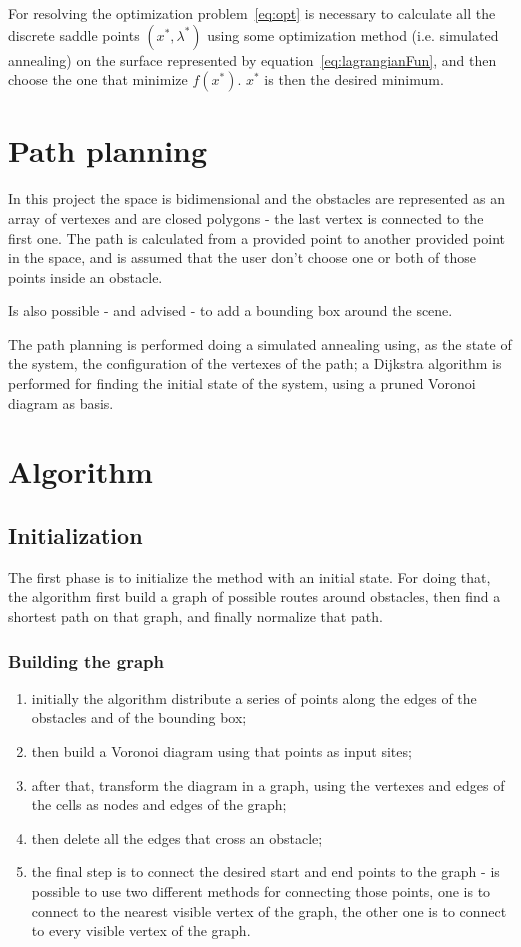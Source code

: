 \documentclass[a4paper]{article}
\begin{document}
For resolving the optimization problem~\eqref{eq:opt} is necessary to
calculate all the discrete saddle points $(x^*,\lambda^*)$ using some
optimization method (i.e. simulated annealing) on the surface
represented by
equation~\eqref{eq:lagrangianFun}, and then choose
the one that minimize $f(x^*)$. $x^*$ is then the desired minimum.

\section{Path planning}
In this project the space is bidimensional and the obstacles are
represented as an array of vertexes and are closed polygons - the last
vertex is connected to the first one. The path is calculated from a
provided point to another provided point in the space, and is assumed
that the user don't choose one or both of those points inside an
obstacle.

Is also possible - and advised - to add a bounding box around the
scene.

The path planning is performed doing a simulated annealing using, as the state of the system, the
configuration of the vertexes of the path; a Dijkstra algorithm is
performed for finding the initial state of the system, using a pruned 
Voronoi diagram as basis.

\section{Algorithm}
\subsection{Initialization}
The first phase is to initialize the method with an initial state. For
doing that, the algorithm first build a graph of possible routes
around obstacles, then find a shortest path on that graph, and finally
normalize that path.

\subsubsection{Building the graph}
\begin{enumerate}
\item\label{item:distDots} initially the algorithm distribute a series of points along the
  edges of the obstacles and of the bounding box;
\item\label{item:voronoi} then build a Voronoi
  diagram using that points as input sites;
\item\label{item:graph} after that, transform the diagram in a graph, using the
  vertexes and edges of the cells as nodes and edges of the graph;
\item\label{item:pruning} then
  delete all the edges that cross an obstacle;
\item\label{item:startEnd} the final step is to connect the desired start and end points to the
  graph - is possible to use two different methods for connecting
  those points, one is to connect to the nearest visible vertex of the
  graph, the other one is to connect to every visible vertex of the
  graph.
\end{enumerate}
\end{document}
